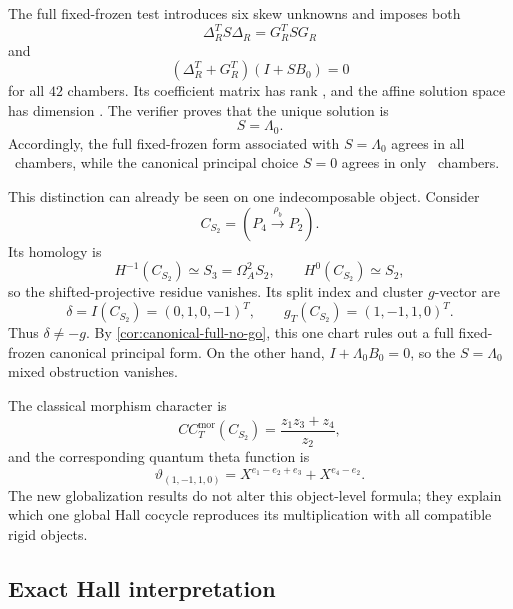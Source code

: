 The full fixed-frozen test introduces six skew unknowns and imposes both
\[
 \Delta_R^TS\Delta_R=G_R^TSG_R
\]
and
\[
 (\Delta_R^T+G_R^T)(I+SB_0)=0
\]
for all $42$ chambers.  Its coefficient matrix has rank
\AIVFullParameterRank, and the affine solution space has dimension
\AIVFullParameterDimension.  The verifier proves that the unique solution is
\begin{equation}
 \boxed{S=\Lambda_0.}
 \label{eq:A4-unique-full-parameter}
\end{equation}
Accordingly, the full fixed-frozen form associated with $S=\Lambda_0$ agrees
in all \AIVLambdaFullCharts\ chambers, while the canonical principal choice
$S=0$ agrees in only \AIVCanonicalFullCharts\ chambers.

This distinction can already be seen on one indecomposable object.  Consider
\begin{equation}
 C_{S_2}=(P_4\xrightarrow{\rho_b}P_2).
 \label{eq:A4-CS2}
\end{equation}
Its homology is
\[
 H^{-1}(C_{S_2})\simeq S_3=\Omega_A^2S_2,
 \qquad
 H^0(C_{S_2})\simeq S_2,
\]
so the shifted-projective residue vanishes.  Its split index and cluster
$g$-vector are
\begin{equation}
 \delta=I(C_{S_2})=(0,1,0,-1)^T,
 \qquad
 g_T(C_{S_2})=(1,-1,1,0)^T.
 \label{eq:A4-delta-g}
\end{equation}
Thus $\delta\ne-g$.  By \cref{cor:canonical-full-no-go}, this one chart rules
out a full fixed-frozen canonical principal form.  On the other hand,
$I+\Lambda_0B_0=0$, so the $S=\Lambda_0$ mixed obstruction vanishes.

The classical morphism character is
\begin{equation}
 CC_T^{\mathrm{mor}}(C_{S_2})
 =\frac{z_1z_3+z_4}{z_2},
 \label{eq:A4-classical-variable}
\end{equation}
and the corresponding quantum theta function is
\begin{equation}
 \vartheta_{(1,-1,1,0)}
 =X^{e_1-e_2+e_3}+X^{e_4-e_2}.
 \label{eq:A4-quantum-variable}
\end{equation}
The new globalization results do not alter this object-level formula; they
explain which one global Hall cocycle reproduces its multiplication with all
compatible rigid objects.

\subsection{Exact Hall interpretation}

